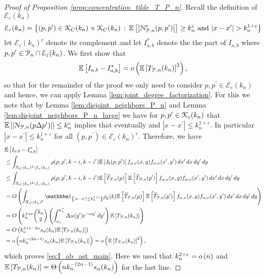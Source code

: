 \begin{proof}[Proof of Proposition \ref{prop:concentration_tilde_T_P_n}]
Recall the definition of $\mathcal{E}_\varepsilon(k_n)$
\[
	\mathcal{E}_{\varepsilon}(k_n) = \left\{(p,p^\prime) \in {\mathcal K}_C(k_n) \times {\mathcal K}_C(k_n) 
	\, : \, \mathbb{E}\left[\left|{\mathcal N}_{{\mathcal P},n}^c(p,p^\prime)\right|\right] \ge k_n^{\varepsilon} \text{ and } |x - x^\prime| > k_n^{1 + \varepsilon} \right\}
\]
let $\mathcal{E}_\varepsilon(k_n)^c$ denote its complement and let $I_{a,b}^\ast$ denote the the part of $I_{a,b}$ where $p,p^\prime \in {\mathcal P}_n \cap \mathcal{E}_\varepsilon(k_n)$. We first show that
\begin{equation}\label{eq:I_ab_ast_main}
	\mathbb{E}\left[I_{a,b} - I_{a,b}^\ast\right] = o\left(\mathbb{E}\left[T_{{\mathcal P},n}(k_n)\right]^2\right),
\end{equation}
so that for the remainder of the proof we only need to consider $p, p^\prime \in \mathcal{E}_\varepsilon(k_n)$ and hence, we can apply Lemma \ref{lem:joint_degree_factorization}. For this we note that by Lemma \ref{lem:disjoint_neighbors_P_n} and Lemma \ref{lem:disjoint_neighbors_P_n_large} we have for $p,p^\prime \in {\mathcal K}_{\varepsilon}(k_n)$ that $\mathbb{E}\left[\left|{\mathcal N}_{{\mathcal P},n}(p\Delta p^\prime)\right|\right] \le k_n^{\varepsilon}$ implies that eventually and $|x-x^\prime| \le k_n^{1+\varepsilon}$. In particular $|x - x^\prime| \le k_n^{1+\varepsilon}$ for all $(p, p^\prime) \in \mathcal{E}_{\varepsilon}(k_n)^c$. Therefore, we have
\begin{align*}
	&\Exp{I_{a,b} - I_{a,b}^\ast}\\
	&\le \int_{\Kcal_C(k_n)^2 \setminus \mathcal{E}_\varepsilon(k_n)} \rho(p, p^\prime, k - i, k - i^\prime) 
		\Exp{J_b(p,p^\prime)} f_{\alpha,\nu}(x,y) f_{\alpha,\nu}(x^\prime,y^\prime) \, dx^\prime \, dx \, dy^\prime \, dy\\
	&\le \int_{\Kcal_C(k_n)^2 \setminus \mathcal{E}_\varepsilon(k_n)} \rho(p, p^\prime, k - i, k - i^\prime) 
		\Exp{\widetilde{T}_{\Pcal,n}(p)}\Exp{\widetilde{T}_{\Pcal,n}(p^\prime)} f_{\alpha,\nu}(x,y) f_{\alpha,\nu}(x^\prime,y^\prime) \, dx^\prime \, dx \, dy^\prime \, dy\\
	&= \bigO{\int_{\Kcal_C(k_n)^2} \ind{|x-x^\prime| \le k_n^{1 + \varepsilon}} \rho_{y}(k) 
		\Exp{\widetilde{T}_{\Pcal,n}(p)}\Exp{\widetilde{T}_{\Pcal,n}(p^\prime)} f_{\alpha,\nu}(x,y) f_{\alpha,\nu}(x^\prime,y^\prime) \, dx^\prime \, dx \, dy^\prime \, dy}\\
	&= \bigO{k_n^{1+\varepsilon} \binom{k_n}{2} \left(\int_{a_n^-}^{a_n^+} \Delta_{\Pcal}(y^\prime) 
			e^{-\alpha y^\prime} \, dy^\prime\right) \Exp{T_{\Pcal,n}(k_n)}}\\
	&= \bigO{k_n^{3 + \varepsilon -2\alpha} s_\alpha(k_n) \Exp{T_{\Pcal,n}(k_n)}}\\
	&= \smallO{n k_n^{-(2\alpha - 1)}s_\alpha(k_n) \Exp{T_{\Pcal,n}(k_n)}} = \smallO{\Exp{T_{\Pcal,n}(k_n)}^2},
\end{align*}
which proves \eqref{eq:I_ab_ast_main}. Here we used that $k_n^{2 + \varepsilon} = o\left(n\right)$ and $\mathbb{E}\left[T_{{\mathcal P},n}(k_n)\right] = \Theta\left(n k_n^{-(2\alpha - 1)}s_\alpha(k_n)\right)$ for the last line.



\end{proof}
